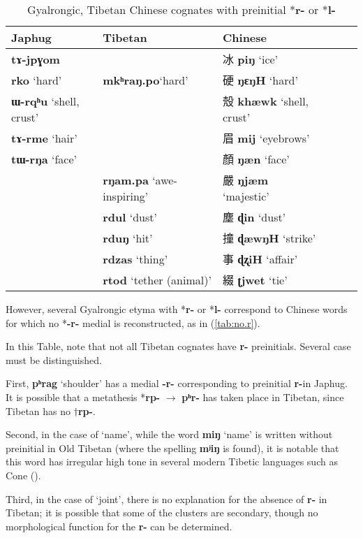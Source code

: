 \documentclass[oneside,a4paper,11pt]{article}
\newcommand{\ipa}[1]{{\phon\mbox{\textbf{#1}}}}
\newcommand{\zh}[1]{{\cn #1}}
\newcommand{\ch}[3]{\zh{#1} \ipa{#2} `#3'}
\begin{document}
\begin{table}
\caption{Gyalrongic, Tibetan Chinese cognates with preinitial *\ipa{r-} or *\ipa{l-}} \label{tab:preinitial.r} \centering
\begin{tabular}{llllll}
\toprule
Japhug & Tibetan & Chinese \\
\midrule
\ipa{tɤ-jpɣom}  &&\ch{冰}{piŋ}{ice} \\
\ipa{rko} `hard'&\ipa{mkʰraŋ.po}`hard'& \ch{硬}{ŋɛŋH}{hard} \\
\ipa{ɯ-rqʰu} `shell, crust' &&\ch{殼}{khæwk}{shell, crust}\\
\ipa{tɤ-rme} `hair' &&\ch{眉}{mij}{eyebrows}\\
\ipa{tɯ-rŋa} `face'&& \ch{顏}{ŋæn}{face} \\
\midrule
&\ipa{rŋam.pa} `awe-inspiring'& \ch{嚴}{ŋjæm}{majestic}\\
&\ipa{rdul} `dust'& \ch{塵}{ɖin}{dust}\\
&\ipa{rduŋ} `hit'& \ch{撞}{ɖæwŋH}{strike}\\
&\ipa{rdzas} `thing'& \ch{事}{ɖʐiH}{affair}\\
&\ipa{rtod} `tether (animal)'& \ch{綴}{ʈjwet}{tie}\\
\bottomrule
\end{tabular}
\end{table}

However, several Gyalrongic etyma with *\ipa{r-} or *\ipa{l-} correspond to Chinese words for which no *\ipa{-r-} medial is reconstructed, as in (\ref{tab:no.r}). 

In this Table, note that not all Tibetan cognates have \ipa{r-} preinitials. Several case must be distinguished. 

First, \ipa{pʰrag} `shoulder' has a medial \ipa{-r-} corresponding to preinitial \ipa{r-}in Japhug. It is possible that a metathesis *\ipa{rp-} $\rightarrow$ \ipa{pʰr-} has taken place in Tibetan, since Tibetan has no $\dagger$\ipa{rp-}.

Second, in the case of `name', while the word \ipa{miŋ} `name' is written without preinitial in Old Tibetan (where the spelling \ipa{mʲiŋ} is found), it is notable that this word has irregular high tone in several modern Tibetic languages such as Cone (\citealt{jacques14cone}).

Third, in the case of `joint', there is no explanation for the absence of \ipa{r-} in Tibetan; it is possible that some of the clusters are secondary, though no morphological function for the \ipa{r-} can be determined.
\end{document}
